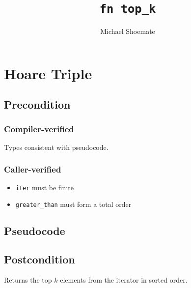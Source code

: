 \documentclass{article}
\title{\texttt{fn top\_k}}
\author{Michael Shoemate}
\begin{document}
\maketitle

\section{Hoare Triple}
\subsection*{Precondition}
\subsubsection*{Compiler-verified}
Types consistent with pseudocode.

\subsubsection*{Caller-verified}

\begin{itemize}
    \item \texttt{iter} must be finite
    \item \texttt{greater\_than} must form a total order
\end{itemize}

\subsection*{Pseudocode}
\label{sec:python-pseudocode}


\subsection*{Postcondition}

\begin{theorem}
    Returns the top $k$ elements from the iterator in sorted order.
\end{theorem}
\end{document}
